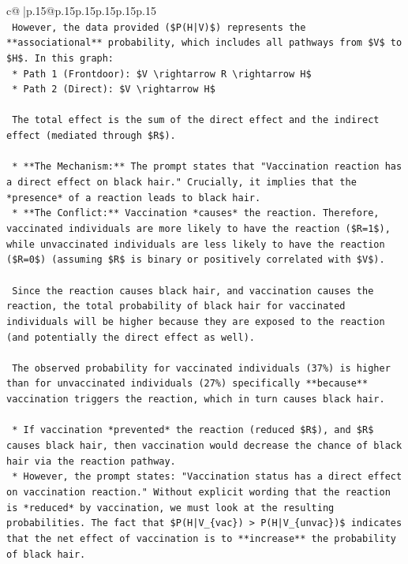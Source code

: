 \documentclass{article}
\begin{document}
{\begin{supertabular}{c@{$\;$}|p{.15\linewidth}@{}p{.15\linewidth}p{.15\linewidth}p{.15\linewidth}p{.15\linewidth}p{.15\linewidth}}
{{{\\ 
\texttt{    However, the data provided (\$P(H|V)\$) represents the **associational** probability, which includes all pathways from \$V\$ to \$H\$. In this graph:} \\
\texttt{    *   Path 1 (Frontdoor): \$V \textbackslash{}rightarrow R \textbackslash{}rightarrow H\$} \\
\texttt{    *   Path 2 (Direct): \$V \textbackslash{}rightarrow H\$} \\
\\ 
\texttt{    The total effect is the sum of the direct effect and the indirect effect (mediated through \$R\$).} \\
\\ 
\texttt{    *   **The Mechanism:** The prompt states that "Vaccination reaction has a direct effect on black hair." Crucially, it implies that the *presence* of a reaction leads to black hair.} \\
\texttt{    *   **The Conflict:** Vaccination *causes* the reaction. Therefore, vaccinated individuals are more likely to have the reaction (\$R=1\$), while unvaccinated individuals are less likely to have the reaction (\$R=0\$) (assuming \$R\$ is binary or positively correlated with \$V\$).} \\
\\ 
\texttt{    Since the reaction causes black hair, and vaccination causes the reaction, the total probability of black hair for vaccinated individuals will be higher because they are exposed to the reaction (and potentially the direct effect as well).} \\
\\ 
\texttt{    The observed probability for vaccinated individuals (37\%) is higher than for unvaccinated individuals (27\%) specifically **because** vaccination triggers the reaction, which in turn causes black hair.} \\
\\ 
\texttt{    *   If vaccination *prevented* the reaction (reduced \$R\$), and \$R\$ causes black hair, then vaccination would decrease the chance of black hair via the reaction pathway.} \\
\texttt{    *   However, the prompt states: "Vaccination status has a direct effect on vaccination reaction." Without explicit wording that the reaction is *reduced* by vaccination, we must look at the resulting probabilities. The fact that \$P(H|V\_\{vac\}) > P(H|V\_\{unvac\})\$ indicates that the net effect of vaccination is to **increase** the probability of black hair.} \\
}}}
\end{supertabular}}
\end{document}
